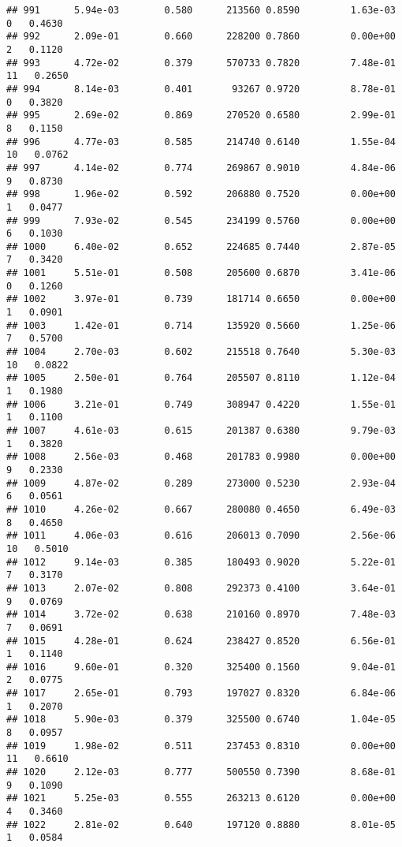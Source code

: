 \documentclass[
]{article}
\begin{document}
\begin{verbatim}
## 991      5.94e-03        0.580      213560 0.8590         1.63e-03   0   0.4630
## 992      2.09e-01        0.660      228200 0.7860         0.00e+00   2   0.1120
## 993      4.72e-02        0.379      570733 0.7820         7.48e-01  11   0.2650
## 994      8.14e-03        0.401       93267 0.9720         8.78e-01   0   0.3820
## 995      2.69e-02        0.869      270520 0.6580         2.99e-01   8   0.1150
## 996      4.77e-03        0.585      214740 0.6140         1.55e-04  10   0.0762
## 997      4.14e-02        0.774      269867 0.9010         4.84e-06   9   0.8730
## 998      1.96e-02        0.592      206880 0.7520         0.00e+00   1   0.0477
## 999      7.93e-02        0.545      234199 0.5760         0.00e+00   6   0.1030
## 1000     6.40e-02        0.652      224685 0.7440         2.87e-05   7   0.3420
## 1001     5.51e-01        0.508      205600 0.6870         3.41e-06   0   0.1260
## 1002     3.97e-01        0.739      181714 0.6650         0.00e+00   1   0.0901
## 1003     1.42e-01        0.714      135920 0.5660         1.25e-06   7   0.5700
## 1004     2.70e-03        0.602      215518 0.7640         5.30e-03  10   0.0822
## 1005     2.50e-01        0.764      205507 0.8110         1.12e-04   1   0.1980
## 1006     3.21e-01        0.749      308947 0.4220         1.55e-01   1   0.1100
## 1007     4.61e-03        0.615      201387 0.6380         9.79e-03   1   0.3820
## 1008     2.56e-03        0.468      201783 0.9980         0.00e+00   9   0.2330
## 1009     4.87e-02        0.289      273000 0.5230         2.93e-04   6   0.0561
## 1010     4.26e-02        0.667      280080 0.4650         6.49e-03   8   0.4650
## 1011     4.06e-03        0.616      206013 0.7090         2.56e-06  10   0.5010
## 1012     9.14e-03        0.385      180493 0.9020         5.22e-01   7   0.3170
## 1013     2.07e-02        0.808      292373 0.4100         3.64e-01   9   0.0769
## 1014     3.72e-02        0.638      210160 0.8970         7.48e-03   7   0.0691
## 1015     4.28e-01        0.624      238427 0.8520         6.56e-01   1   0.1140
## 1016     9.60e-01        0.320      325400 0.1560         9.04e-01   2   0.0775
## 1017     2.65e-01        0.793      197027 0.8320         6.84e-06   1   0.2070
## 1018     5.90e-03        0.379      325500 0.6740         1.04e-05   8   0.0957
## 1019     1.98e-02        0.511      237453 0.8310         0.00e+00  11   0.6610
## 1020     2.12e-03        0.777      500550 0.7390         8.68e-01   9   0.1090
## 1021     5.25e-03        0.555      263213 0.6120         0.00e+00   4   0.3460
## 1022     2.81e-02        0.640      197120 0.8880         8.01e-05   1   0.0584

\end{verbatim}
\end{document}
